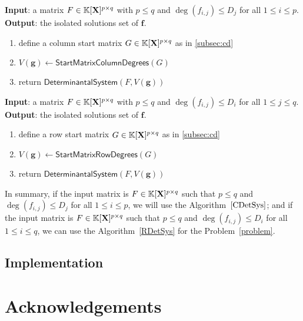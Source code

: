 \documentclass[11pt]{article}
\numberwithin{Property}{section}
\numberwithin{Theorem}{section}
\numberwithin{Proposition}{section}
\numberwithin{Lemma}{section}
\numberwithin{Corollary}{section}
\numberwithin{Definition}{section}
\numberwithin{Remark}{section}
\numberwithin{Conjecture}{section}
\numberwithin{Problem}{section}
\numberwithin{Claim}{section}
\theoremstyle{definition}
\numberwithin{Example}{section}
\def\f {\ensuremath{\mathbf{f}}}
\def\g {\ensuremath{\mathbf{g}}}
\renewcommand{\leq}{\leqslant}
\newcommand{\field}{\mathbb{K}} %
\newcommand{\mat}[1]{\mathbf{\MakeUppercase{#1}}} %
\begin{document}
\begin{algorithm}
\caption{$\mathsf{ColumnDeterminantal System}$}
\label{CDetSys}
{\bf Input}: a matrix $F \in \field[\mat{X}]^{p \times q}$ with $p \leq q$ and $\deg(f_{i,j}) \leq D_j$ for all $1 \leq i \leq p$.\\
{\bf Output}: the isolated solutions set of $\f$. 
\begin{enumerate}
\item define a column start matrix $G \in \field[\mat{X}]^{p \times q}$ as in \cref{subsec:cd}
\item $V(\g) \gets \mathsf{Start Matrix Column Degrees}(G)$
\item return $\mathsf{Determinantal System}(F, V(\g))$
\end{enumerate}
\end{algorithm}

\begin{algorithm}
\caption{$\mathsf{RowDeterminantal System}$}
\label{RDetSys}
{\bf Input}: a matrix $F \in \field[\mat{X}]^{p \times q}$ with $p \leq q$ and $\deg(f_{i,j}) \leq D_i$ for all $1 \leq j \leq q$.\\
{\bf Output}: the isolated solutions set of $\f$.
\begin{enumerate}
\item define a row start matrix $G \in \field[\mat{X}]^{p \times q}$ as in \cref{subsec:cd}
\item $V(\g) \gets \mathsf{Start Matrix Row Degrees}(G)$
\item return $\mathsf{Determinantal System}(F, V(\g))$
\end{enumerate}
\end{algorithm}
In summary, if the input matrix is $F \in \field[\mat{X}]^{p \times q}$ such that $p \leq q$ and $\deg(f_{i,j}) \leq D_j$ for all $1 \leq i \leq p$, we will use the Algorithm~$\ref{CDetSys}$; and if the input matrix is $F \in \field[\mat{X}]^{p \times q}$ such that $p \leq q$ and $\deg(f_{i,j}) \leq D_i$ for all $1 \leq i \leq q$, we can use the Algorithm~\ref{RDetSys} for the Problem~\ref{problem}. 
\subsection{Implementation}
\section{Acknowledgements}
\newpage


\appendix
\end{document}
